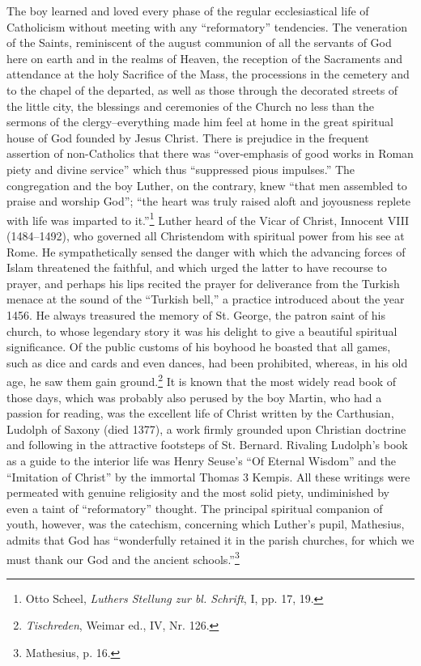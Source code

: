 The boy learned and loved every phase of the regular ecclesiastical
life of Catholicism without meeting with any “reformatory” tendencies.
The veneration of the Saints, reminiscent of the august communion of all the servants
of God here on earth and in the realms of Heaven, the reception of
the Sacraments and attendance at the
holy Sacrifice of the Mass, the processions in the cemetery and to
the chapel of the departed, as well as those through the decorated
streets of the little city, the blessings and ceremonies of the Church
no less than the sermons of the clergy--everything made him feel
at home in the great spiritual house of God founded by Jesus Christ.
There is prejudice in the frequent assertion of non-Catholics that
there was “over-emphasis of good works in Roman piety and divine
service” which thus “suppressed pious impulses.” The congregation
and the boy Luther, on the contrary, knew “that men assembled
to praise and worship God”; “the heart was truly raised aloft and
joyousness replete with life was imparted to it.”\footnote{Otto Scheel, \textit{Luthers Stellung zur bl. Schrift}, I, pp. 17, 19.}
Luther heard of the Vicar of Christ, Innocent VIII (1484--1492), who governed
all Christendom with spiritual power from his see at Rome. He
sympathetically sensed the danger with which the advancing forces
of Islam threatened the faithful, and which urged the latter to have
recourse to prayer, and perhaps his lips recited the prayer for deliverance
from the Turkish menace at the sound of the “Turkish bell,”
a practice introduced about the year 1456. He always treasured
the memory of St. George, the patron saint of his church, to whose
legendary story it was his delight to give a beautiful spiritual
significance. Of the public customs of his boyhood he boasted
that all games, such as dice and cards and even dances, had been
prohibited, whereas, in his old age, he saw them gain ground.\footnote{\textit{Tischreden}, Weimar ed., IV, Nr. 126.}
It
is known that the most widely read book of those days, which was
probably also perused by the boy Martin, who had a passion for
reading, was the excellent life of Christ written by the Carthusian,
Ludolph of Saxony (died 1377), a work firmly grounded upon
Christian doctrine and following in the attractive footsteps of St.
Bernard. Rivaling Ludolph’s book as a guide to the interior life
was Henry Seuse’s “Of Eternal Wisdom” and the “Imitation of
Christ” by the immortal Thomas 3 Kempis. All these writings were
permeated with genuine religiosity and the most solid piety, undiminished by even a taint of “reformatory” thought. The principal
spiritual companion of youth, however, was the catechism, concerning which Luther’s pupil, Mathesius, admits that God has “wonderfully retained it in the parish churches, for which we must thank
our God and the ancient schools.”\footnote{Mathesius, p. 16.}

